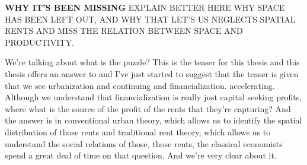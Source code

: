 \textbf{WHY IT'S BEEN MISSING}
EXPLAIN BETTER HERE WHY SPACE HAS BEEN LEFT OUT, AND WHY THAT LET'S US NEGLECTS SPATIAL RENTS AND MISS THE RELATION BETWEEN SPACE AND PRODUCTIVITY.

We're talking about what is the puzzle? This is the teaser for this thesis and this thesis offers an answer to and I've just started to suggest that the teaser is given that we see urbanization and continuing and financialization. accelerating. Although we understand that financialization is really just capital seeking profits, where what is the source of the profit of the rents that they're capturing? And the answer is in conventional urban theory, which allows us to identify the spatial distribution of those rents and traditional rent theory, which allows us to understand the social relations of those, those rents, the classical economists spend a great deal of time on that question. And we're very clear about it.


